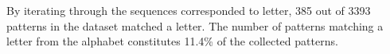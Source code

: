   By iterating through the sequences corresponded to letter, 385 out of 3393 patterns in the dataset matched a letter. The number of patterns matching a letter from the alphabet constitutes 11.4\% of the collected patterns.

    \clearpage

      \begin{figure}[H]
        \centering
        \vspace{1.5cm}


        \vspace{0.5cm}


\end{figure}
